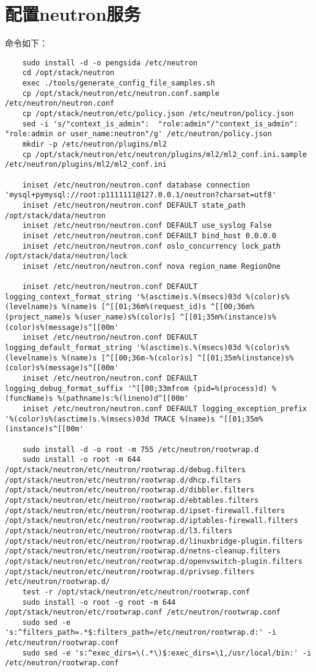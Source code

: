 \documentclass[a4paper,left=1.5cm,right=1.5cm,11pt]{article}
\begin{document}
\section{配置neutron服务}
	命令如下：
	\begin{lstlisting}
	sudo install -d -o pengsida /etc/neutron
	cd /opt/stack/neutron
	exec ./tools/generate_config_file_samples.sh
	cp /opt/stack/neutron/etc/neutron.conf.sample /etc/neutron/neutron.conf
	cp /opt/stack/neutron/etc/policy.json /etc/neutron/policy.json
	sed -i 's/"context_is_admin":  "role:admin"/"context_is_admin":  "role:admin or user_name:neutron"/g' /etc/neutron/policy.json
	mkdir -p /etc/neutron/plugins/ml2
	cp /opt/stack/neutron/etc/neutron/plugins/ml2/ml2_conf.ini.sample /etc/neutron/plugins/ml2/ml2_conf.ini
	
	iniset /etc/neutron/neutron.conf database connection 'mysql+pymysql://root:p1111111@127.0.0.1/neutron?charset=utf8'
	iniset /etc/neutron/neutron.conf DEFAULT state_path /opt/stack/data/neutron
	iniset /etc/neutron/neutron.conf DEFAULT use_syslog False
	iniset /etc/neutron/neutron.conf DEFAULT bind_host 0.0.0.0
	iniset /etc/neutron/neutron.conf oslo_concurrency lock_path /opt/stack/data/neutron/lock
	iniset /etc/neutron/neutron.conf nova region_name RegionOne

	iniset /etc/neutron/neutron.conf DEFAULT logging_context_format_string '%(asctime)s.%(msecs)03d %(color)s%(levelname)s %(name)s [^[[01;36m%(request_id)s ^[[00;36m%(project_name)s %(user_name)s%(color)s] ^[[01;35m%(instance)s%(color)s%(message)s^[[00m'
	iniset /etc/neutron/neutron.conf DEFAULT logging_default_format_string '%(asctime)s.%(msecs)03d %(color)s%(levelname)s %(name)s [^[[00;36m-%(color)s] ^[[01;35m%(instance)s%(color)s%(message)s^[[00m'
	iniset /etc/neutron/neutron.conf DEFAULT logging_debug_format_suffix '^[[00;33mfrom (pid=%(process)d) %(funcName)s %(pathname)s:%(lineno)d^[[00m'
	iniset /etc/neutron/neutron.conf DEFAULT logging_exception_prefix '%(color)s%(asctime)s.%(msecs)03d TRACE %(name)s ^[[01;35m%(instance)s^[[00m'

	sudo install -d -o root -m 755 /etc/neutron/rootwrap.d
	sudo install -o root -m 644 /opt/stack/neutron/etc/neutron/rootwrap.d/debug.filters /opt/stack/neutron/etc/neutron/rootwrap.d/dhcp.filters /opt/stack/neutron/etc/neutron/rootwrap.d/dibbler.filters /opt/stack/neutron/etc/neutron/rootwrap.d/ebtables.filters /opt/stack/neutron/etc/neutron/rootwrap.d/ipset-firewall.filters /opt/stack/neutron/etc/neutron/rootwrap.d/iptables-firewall.filters /opt/stack/neutron/etc/neutron/rootwrap.d/l3.filters /opt/stack/neutron/etc/neutron/rootwrap.d/linuxbridge-plugin.filters /opt/stack/neutron/etc/neutron/rootwrap.d/netns-cleanup.filters /opt/stack/neutron/etc/neutron/rootwrap.d/openvswitch-plugin.filters /opt/stack/neutron/etc/neutron/rootwrap.d/privsep.filters /etc/neutron/rootwrap.d/
	test -r /opt/stack/neutron/etc/neutron/rootwrap.conf
	sudo install -o root -g root -m 644 /opt/stack/neutron/etc/rootwrap.conf /etc/neutron/rootwrap.conf
	sudo sed -e 's:^filters_path=.*$:filters_path=/etc/neutron/rootwrap.d:' -i /etc/neutron/rootwrap.conf
	sudo sed -e 's:^exec_dirs=\(.*\)$:exec_dirs=\1,/usr/local/bin:' -i /etc/neutron/rootwrap.conf


\end{lstlisting}
\end{document}
